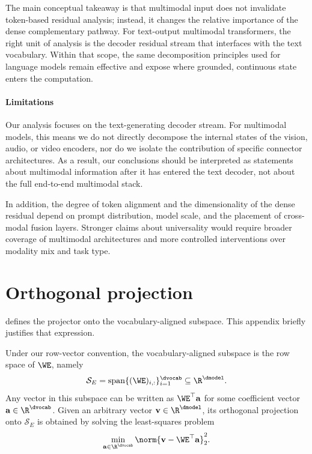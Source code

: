 \documentclass{article}
\begin{document}
The main conceptual takeaway is that multimodal input does not invalidate token-based residual analysis; instead, it changes the relative importance of the dense complementary pathway. For text-output multimodal transformers, the right unit of analysis is the decoder residual stream that interfaces with the text vocabulary. Within that scope, the same decomposition principles used for language models remain effective and expose where grounded, continuous state enters the computation.

\paragraph{Limitations}
Our analysis focuses on the text-generating decoder stream. For multimodal models, this means we do not directly decompose the internal states of the vision, audio, or video encoders, nor do we isolate the contribution of specific connector architectures. As a result, our conclusions should be interpreted as statements about multimodal information after it has entered the text decoder, not about the full end-to-end multimodal stack.

In addition, the degree of token alignment and the dimensionality of the dense residual depend on prompt distribution, model scale, and the placement of cross-modal fusion layers. Stronger claims about universality would require broader coverage of multimodal architectures and more controlled interventions over modality mix and task type.





\appendix


\section{Orthogonal projection} \label{apd:projection}
 defines the projector onto the vocabulary-aligned subspace. This appendix briefly justifies that expression.

Under our row-vector convention, the vocabulary-aligned subspace is the row space of $\WE$, namely
\begin{equation}
  \mathcal{S}_E = \mathrm{span}\{(\WE)_{i,:}\}_{i=1}^{\dvocab} \subseteq \R^{\dmodel} .
\end{equation}
Any vector in this subspace can be written as $\WE^\top \mathbf{a}$ for some coefficient vector $\mathbf{a} \in \R^{\dvocab}$. Given an arbitrary vector $\mathbf{v} \in \R^{\dmodel}$, its orthogonal projection onto $\mathcal{S}_E$ is obtained by solving the least-squares problem
\begin{equation}
    \min_{\mathbf{a} \in \R^{\dvocab}} \norm{\mathbf{v} - \WE^\top \mathbf{a}}_2^2.
\end{equation}
\end{document}
